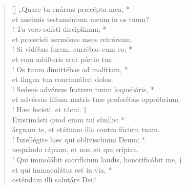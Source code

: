 \begin{verse}[\versewidth]
\vin „Quare tu enárras præcépta mea, *\\
\vin et assúmis testaméntum meum in os tuum?\\!
Tu vero odísti disciplínam, *\\
et proiecísti sermónes meos retrórsum.\\!
\vin Si vidébas furem, currébas cum eo; *\\
\vin et cum adúlteris erat pórtio tua.\\!
Os tuum dimittébas ad malítiam, *\\
et lingua tua concinnábat dolos.\\!
\vin Sedens advérsus fratrem tuum loquebáris, *\\
\vin et advérsus fílium matris tuæ proferébas oppróbrium.\\!
Hæc fecísti, et tácui. †\\
Existimásti quod eram tui símilis: *\\
árguam te, et státuam illa contra fáciem tuam.\\!
\vin Intellégite hæc qui obliviscímini Deum; *\\
\vin nequándo rápiam, et non sit qui erípiat.\\!
Qui immolábit sacrifícium laudis, honorificábit me, †\\
et qui immaculátus est in via, *\\
osténdam illi salutáre Dei.“\\
\end{verse}
\vspace{1cm}


